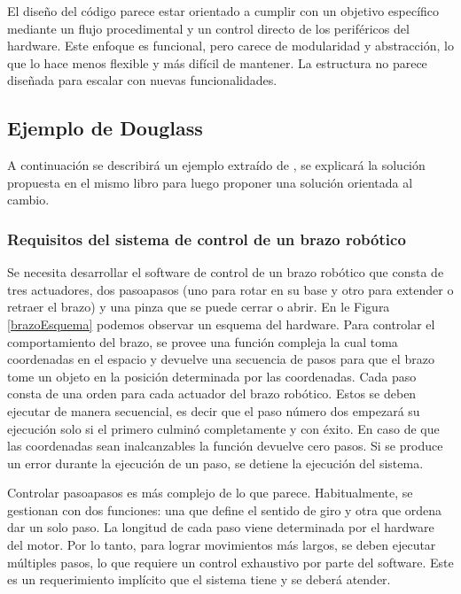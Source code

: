 El diseño del código parece estar orientado a cumplir con un objetivo específico mediante un flujo procedimental y un control directo de los periféricos del hardware. Este enfoque es funcional, pero carece de modularidad y abstracción, lo que lo hace menos flexible y más difícil de mantener. La estructura no parece diseñada para escalar con nuevas funcionalidades.

\subsection*{Ejemplo de Douglass}

A continuación se describirá un ejemplo extraído de \cite[Sección. 3.4]{douglass}, se explicará la solución propuesta en el mismo libro para luego proponer una solución orientada al cambio.

\subsubsection*{Requisitos del sistema de control de un brazo robótico}
\label{requisitos}

Se necesita desarrollar el software de control de un brazo robótico que consta de tres \gls{actuadores}, dos \glspl{pasoapaso} (uno para rotar en su base y otro para extender o retraer el brazo) y una pinza que se puede cerrar o abrir. En le Figura \ref{brazoEsquema} podemos observar un esquema del hardware. Para controlar el comportamiento del brazo, se provee una función compleja la cual toma coordenadas en el espacio y devuelve una secuencia de pasos para que el brazo tome un objeto en la posición determinada por las coordenadas. Cada paso consta de una orden para cada actuador del brazo robótico. Estos se deben ejecutar de manera secuencial, es decir que el paso número dos empezará su ejecución solo si el primero culminó completamente y con éxito. En caso de que las coordenadas sean inalcanzables la función devuelve cero pasos. Si se produce un error durante la ejecución de un paso, se detiene la ejecución del sistema.

Controlar \glspl{pasoapaso} es más complejo de lo que parece. Habitualmente, se gestionan con dos funciones: una que define el sentido de giro y otra que ordena dar un solo paso. La longitud de cada paso viene determinada por el hardware del motor. Por lo tanto, para lograr movimientos más largos, se deben ejecutar múltiples pasos, lo que requiere un control exhaustivo por parte del software. Este es un requerimiento implícito que el sistema tiene y se deberá atender.

